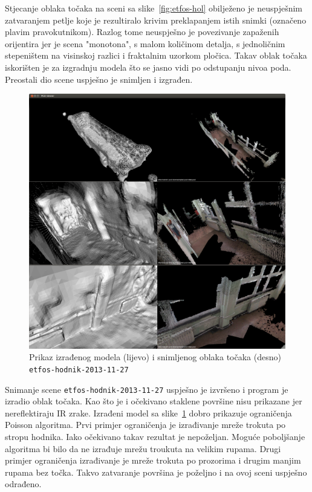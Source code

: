 Stjecanje oblaka točaka na sceni sa slike~\ref{fig:etfos-hol} obilježeno
je neuspješnim zatvaranjem petlje koje je rezultiralo krivim
preklapanjem istih snimki (označeno plavim pravokutnikom). Razlog tome
neuspješno je povezivanje zapaženih orijentira jer je scena "monotona",
s malom količinom detalja, s jednoličnim stepeništem na visinskoj
razlici i fraktalnim uzorkom pločica. Takav oblak točaka iskorišten je
za izgradnju modela što se jasno vidi po odstupanju nivoa poda.
Preostali dio scene uspješno je snimljen i izgrađen.

\newpage
\begin{figure}[h]
\centering
\includegraphics[scale=0.25]{figures/04-etfos-hodnik1-vtk-pcd-all.png}
\caption{Prikaz izrađenog modela (lijevo) i snimljenog oblaka točaka
(desno) \texttt{etfos-hodnik-2013-11-27}} 
\label{fig:etfos-hodnik}
\end{figure}

Snimanje scene \texttt{etfos-hodnik-2013-11-27} uspješno je izvršeno i
program je izradio oblak točaka. Kao što je i očekivano staklene
površine nisu prikazane jer nereflektiraju IR zrake. Izrađeni model sa
slike~\ref{fig:etfos-hodnik} dobro prikazuje ograničenja Poisson
algoritma. Prvi primjer ograničenja je izrađivanje mreže trokuta po
stropu hodnika. Iako očekivano takav rezultat je nepoželjan. Moguće
poboljšanje algoritma bi bilo da ne izrađuje mrežu troukuta na velikim
rupama. Drugi primjer ograničenja izrađivanje je mreže trokuta po
prozorima i drugim manjim rupama bez točka. Takvo zatvaranje površina je
poželjno i na ovoj sceni uspješno odrađeno.



